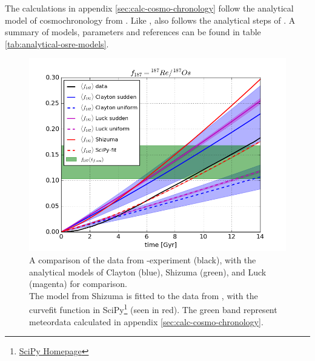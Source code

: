 The calculations in appendix \ref{sec:calc-cosmo-chronology} follow the analytical model of cosmochronology from .
Like ,  also follows the analytical steps of .
A summary of models, parameters and references can be found in table \ref{tab:analytical-osre-models}.

\begin{figure}[h]
  \centering
  \includegraphics[width=\figwidth]{results/MCExperiment_revised_2_delmax/model_fitting.png}
  \caption[Analytical models for cosmochronology]{ \label{fig:osre-model-fitting}
    A comparison of the data from \omegamodel-experiment \expone (black), with the analytical models of Clayton (blue), Shizuma (green), and Luck (magenta) for comparison. \\
    The model from Shizuma is fitted to the data from \omegamodel, with the curvefit function in SciPy\footnote{\href{https://www.scipy.org/}{SciPy Homepage}} (seen in red).
    The green band represent meteordata calculated in appendix \ref{sec:calc-cosmo-chronology}.
  }
\end{figure}

